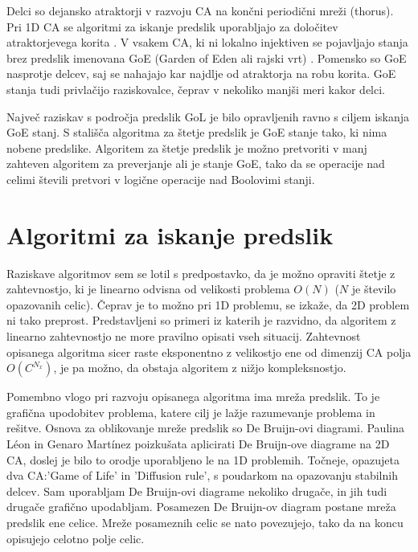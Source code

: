 \documentclass[12pt,a4paper,openany,twoside]{book}
\begin{document}
Delci so dejansko atraktorji v razvoju CA na končni periodični mreži (thorus).
Pri 1D CA se algoritmi za iskanje predslik uporabljajo za določitev atraktorjevega korita \cite{Wuensche1992}.
V vsakem CA, ki ni lokalno injektiven se pojavljajo stanja brez predslik imenovana GoE
(Garden of Eden ali rajski vrt) \cite{Moore1962, Myhill1963}.
Pomensko so GoE nasprotje delcev, saj se nahajajo kar
najdlje od atraktorja na robu korita. GoE stanja tudi privlačijo raziskovalce,
čeprav v nekoliko manjši meri kakor delci.

Največ raziskav s področja predslik GoL je bilo opravljenih ravno s ciljem iskanja GoE stanj.
S stališča algoritma za štetje predslik je GoE stanje tako, ki nima nobene predslike.
Algoritem za štetje predslik je možno pretvoriti v manj zahteven algoritem za preverjanje ali je stanje GoE,
tako da se operacije nad celimi števili pretvori v logične operacije nad Boolovimi stanji.

\section{Algoritmi za iskanje predslik}

Raziskave algoritmov sem se lotil s predpostavko, da je možno opraviti štetje z zahtevnostjo,
ki je linearno odvisna od velikosti problema \( O(N) \)  (\(N\) je število opazovanih celic).
Čeprav je to možno pri 1D problemu, se izkaže, da 2D problem ni tako preprost.
Predstavljeni so primeri iz katerih je razvidno,
da algoritem z linearno zahtevnostjo ne more pravilno opisati vseh situacij.
Zahtevnost opisanega algoritma sicer raste eksponentno z velikostjo ene
od dimenzij CA polja \( O(C^{N_x}) \), je pa možno, da obstaja algoritem z nižjo kompleksnostjo.

Pomembno vlogo pri razvoju opisanega algoritma ima mreža predslik.
To je grafična upodobitev problema, katere cilj je lažje razumevanje problema in rešitve.
Osnova za oblikovanje mreže predslik so De Bruijn-ovi diagrami.
Paulina Léon in Genaro Martínez \cite{PaulinaGenaro2016}
poizkušata aplicirati De Bruijn-ove diagrame na 2D CA,
doslej je bilo to orodje uporabljeno le na 1D problemih.
Točneje, opazujeta dva CA:'Game of Life' in 'Diffusion rule',
s poudarkom na opazovanju stabilnih delcev.
Sam uporabljam De Bruijn-ovi diagrame nekoliko drugače,
in jih tudi drugače grafično upodabljam.
Posamezen De Bruijn-ov diagram postane mreža predslik ene celice.
Mreže posameznih celic se nato povezujejo,
tako da na koncu opisujejo celotno polje celic.
\end{document}
